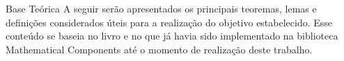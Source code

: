 \begin{frame}{Base Teórica}
    A seguir serão apresentados os principais teoremas, lemas e definições considerados úteis para a realização do objetivo estabelecido. Esse conteúdo se baseia no livro \cite{book:2399854} e no que já havia sido implementado na biblioteca Mathematical Components até o momento de realização deste trabalho.
\end{frame}